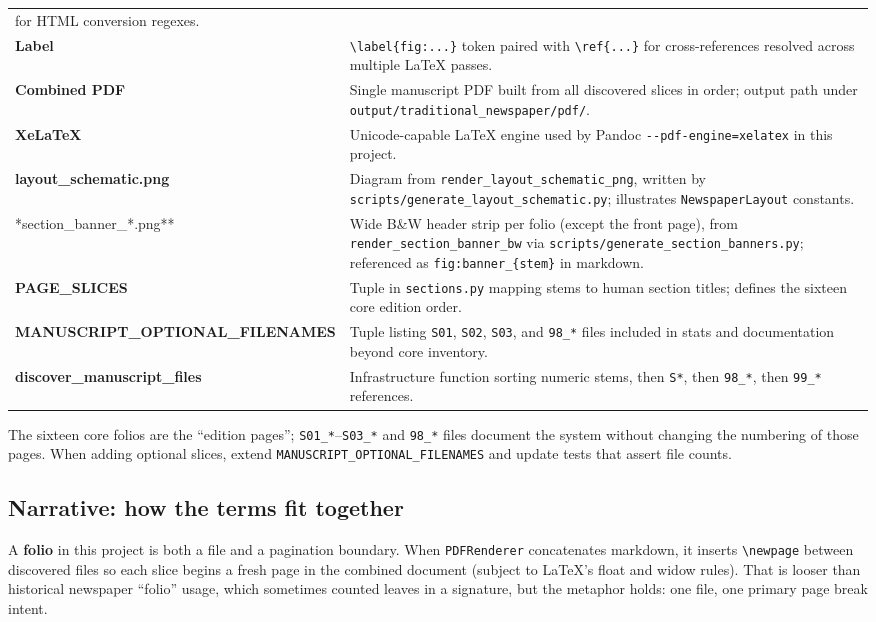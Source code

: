 \documentclass[
]{article}
\begin{document}
{\begin{longtable}[]{@{}
  >{\raggedright\arraybackslash}p{}
  >{\raggedright\arraybackslash}p{}@{}}
for HTML conversion regexes. \\
\textbf{Label} & \texttt{\textbackslash{}label\{fig:...\}} token paired
with \texttt{\textbackslash{}ref\{...\}} for cross-references resolved
across multiple LaTeX passes. \\
\textbf{Combined PDF} & Single manuscript PDF built from all discovered
slices in order; output path under
\texttt{output/traditional\_newspaper/pdf/}. \\
\textbf{XeLaTeX} & Unicode-capable LaTeX engine used by Pandoc
\texttt{-\/-pdf-engine=xelatex} in this project. \\
\textbf{layout\_schematic.png} & Diagram from
\texttt{render\_layout\_schematic\_png}, written by
\texttt{scripts/generate\_layout\_schematic.py}; illustrates
\texttt{NewspaperLayout} constants. \\
**section\_banner\_*.png** & Wide B\&W header strip per folio (except
the front page), from \texttt{render\_section\_banner\_bw} via
\texttt{scripts/generate\_section\_banners.py}; referenced as
\texttt{fig:banner\_\{stem\}} in markdown. \\
\textbf{PAGE\_SLICES} & Tuple in \texttt{sections.py} mapping stems to
human section titles; defines the sixteen core edition order. \\
\textbf{MANUSCRIPT\_OPTIONAL\_FILENAMES} & Tuple listing \texttt{S01},
\texttt{S02}, \texttt{S03}, and \texttt{98\_*} files included in stats
and documentation beyond core inventory. \\
\textbf{discover\_manuscript\_files} & Infrastructure function sorting
numeric stems, then \texttt{S*}, then \texttt{98\_*}, then
\texttt{99\_*} references. \\
\end{longtable}
}

The sixteen core folios are the ``edition pages'';
\texttt{S01\_*}--\texttt{S03\_*} and \texttt{98\_*} files document the
system without changing the numbering of those pages. When adding
optional slices, extend \texttt{MANUSCRIPT\_OPTIONAL\_FILENAMES} and
update tests that assert file counts.

\subsection{Narrative: how the terms fit
together}\label{narrative-how-the-terms-fit-together}

A \textbf{folio} in this project is both a file and a pagination
boundary. When \texttt{PDFRenderer} concatenates markdown, it inserts
\texttt{\textbackslash{}newpage} between discovered files so each slice
begins a fresh page in the combined document (subject to LaTeX's float
and widow rules). That is looser than historical newspaper ``folio''
usage, which sometimes counted leaves in a signature, but the metaphor
holds: one file, one primary page break intent.
\end{document}
